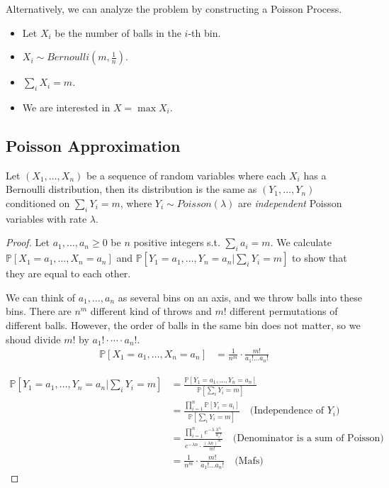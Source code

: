         Alternatively, we can analyze the problem by constructing a Poisson Process.

        \begin{itemize}
            \item Let $X_i$ be the number of balls in the $i$-th bin.
            \item $X_i \sim Bernoulli(m, \frac{1}{n})$.
            \item $\sum_i X_i = m$.
            \item We are interested in $X = \max X_i$.
        \end{itemize}

    \subsection{Poisson Approximation}
        \begin{theorem}\label{Thm:PoissonApproximation}
            Let $(X_1,\dots,X_n)$ be a sequence of random variables where each $X_i$ has a Bernoulli distribution, then its distribution is the same as $(Y_1, \dots, Y_n)$ conditioned on $\sum_i Y_i = m$, where $Y_i \sim Poisson(\lambda)$ are \emph{independent} Poisson variables with rate $\lambda$.
        \end{theorem}
        \begin{proof}
            Let $a_1, \dots, a_n \ge 0$ be $n$ positive integers s.t. $\sum_i a_i = m$. We calculate $\mathbb{P}[X_1 = a_1, \dots, X_n = a_n]$ and $\mathbb{P}[Y_1 = a_1, \dots, Y_n = a_n|\sum_i Y_i=m]$ to show that they are equal to each other.

            We can think of $a_1,\dots,a_n$ as several bins on an axis, and we throw balls into these bins. There are $n^m$ different kind of throws and $m!$ different permutations of different balls. However, the order of balls in the same bin does not matter, so we shoud divide $m!$ by $a_1!\cdot \cdots \cdot a_n!$.
            \begin{align*}
                \mathbb{P}[X_1 = a_1, \dots, X_n = a_n]
                &= \frac{1}{n^m} \cdot \frac{m!}{a_1! \dots a_n!}
            \end{align*}

            \begin{align*}
                \mathbb{P}[Y_1 = a_1, \dots, Y_n = a_n | \sum_iY_i = m]
                &= \frac{\mathbb{P}[Y_1=a_1,\dots,Y_n=a_n]}{\mathbb{P}[\sum_i Y_i = m]}\\
                &= \frac{\prod_{i=1}^n \mathbb{P}[Y_i = a_i]}{\mathbb{P}[\sum_i Y_i = m]} \quad \text{(Independence of $Y_i$)}\\
                &= \frac{\prod_{i=1}^n e^{-\lambda}\frac{\lambda^{a_i}}{a_i!}}{e^{-\lambda n} \cdot \frac{(\lambda n)^m}{m!}} \quad \text{(Denominator is a sum of Poisson)}\\
                &= \frac{1}{n^m} \cdot \frac{m!}{a_1! \dots a_n!} \quad \text{(Mafs)}
            \end{align*}

        \end{proof}

